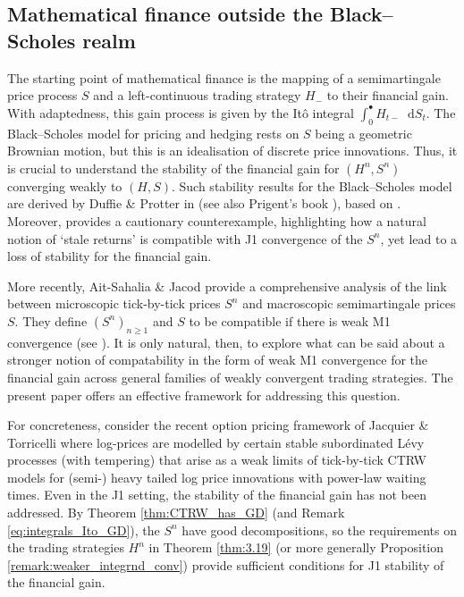 \documentclass[11pt]{article}
\theoremstyle{definition}\newtheorem{example}[theorem]{Example}
\theoremstyle{definition}\newtheorem{counterexample}[theorem]{Counterexample}
\theoremstyle{definition}\newtheorem{remark}[theorem]{Remark}
\theoremstyle{definition}\newtheorem{defi}[theorem]{Definition}
\numberwithin{equation}{section}
\newcommand*\diff{\mathop{}\!\mathrm{d}}								%
\renewcommand{\|}{\; : \, \;}											%
\begin{document}
\subsection{Mathematical finance outside the Black--Scholes realm}\label{sect:asset_prices}

 The starting point of mathematical finance is the mapping of a semimartingale price process $S$ and a left-continuous trading strategy $H_{-}$ to their financial gain. With adaptedness, this gain process is given by the It{\^o} integral $\int_0^\bullet \!H_{t-} \diff S_t$. The Black--Scholes model for pricing and hedging rests on $S$ being a geometric Brownian motion, but this is an idealisation of discrete price innovations. Thus, it is crucial to understand the stability of the financial gain for $(H^n,S^n)$ converging weakly to $(H,S)$. Such stability results for the Black--Scholes model are derived by Duffie \& Protter in \cite{duffie_protter} (see also Prigent's book \cite{prigent}), based on \cite{kurtzprotter}. Moreover, \cite{duffie_protter} provides a cautionary counterexample, highlighting how a natural notion of `stale returns' is compatible with J1 convergence of the $S^n$, yet lead to a loss of stability for the financial gain.

More recently, Ait-Sahalia \& Jacod \cite{ait-sahalia_jacod} provide a comprehensive analysis of the link between microscopic tick-by-tick prices $S^n$ and macroscopic semimartingale prices $S$. They define $(S^n)_{n\geq1}$ and $S$ to be compatible if there is weak M1 convergence (see \cite[Def.~2]{ait-sahalia_jacod}). It is only natural, then, to explore what can be said about a stronger notion of compatability in the form of weak M1 convergence for the financial gain across general families of weakly convergent trading strategies. The present paper offers an effective framework for addressing this question.


For concreteness, consider the recent option pricing framework of Jacquier \& Torricelli \cite{jack} where log-prices are modelled by certain stable subordinated L\'evy processes (with tempering) that arise as a weak limits of tick-by-tick CTRW models for (semi-) heavy tailed log price innovations with power-law waiting times. Even in the J1 setting, the stability of the financial gain has not been addressed. By Theorem \ref{thm:CTRW_has_GD} (and Remark \ref{eq:integrals_Ito_GD}), the $S^n$ have good decompositions, so the requirements on the trading strategies $H^n$ in Theorem \ref{thm:3.19} (or more generally Proposition \ref{remark:weaker_integrnd_conv}) provide sufficient conditions for J1 stability of the financial gain.
\end{document}
